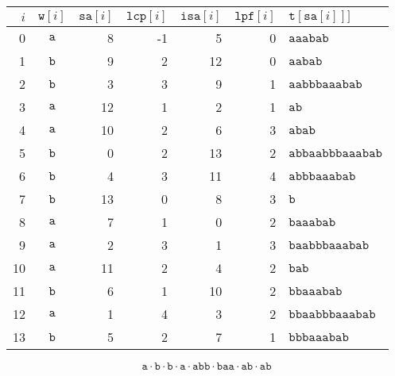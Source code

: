 \begin{center}
\begin{tabular}{rcrrrrl}\hline
$i$ & $\mathtt{w}[i]$ & $\mathtt{sa}[i]$ & $\mathtt{lcp}[i]$ & $\mathtt{isa}[i]$ & $\mathtt{lpf}[i]$ & $\mathtt{t}[\mathtt{sa}[i]]]$\\\hline
0 & $\mathtt{a}$ & 8 & -1 & 5 & 0 & $\mathtt{aaabab}$\\
1 & $\mathtt{b}$ & 9 & 2 & 12 & 0 & $\mathtt{aabab}$\\
2 & $\mathtt{b}$ & 3 & 3 & 9 & 1 & $\mathtt{aabbbaaabab}$\\
3 & $\mathtt{a}$ & 12 & 1 & 2 & 1 & $\mathtt{ab}$\\
4 & $\mathtt{a}$ & 10 & 2 & 6 & 3 & $\mathtt{abab}$\\
5 & $\mathtt{b}$ & 0 & 2 & 13 & 2 & $\mathtt{abbaabbbaaabab}$\\
6 & $\mathtt{b}$ & 4 & 3 & 11 & 4 & $\mathtt{abbbaaabab}$\\
7 & $\mathtt{b}$ & 13 & 0 & 8 & 3 & $\mathtt{b}$\\
8 & $\mathtt{a}$ & 7 & 1 & 0 & 2 & $\mathtt{baaabab}$\\
9 & $\mathtt{a}$ & 2 & 3 & 1 & 3 & $\mathtt{baabbbaaabab}$\\
10 & $\mathtt{a}$ & 11 & 2 & 4 & 2 & $\mathtt{bab}$\\
11 & $\mathtt{b}$ & 6 & 1 & 10 & 2 & $\mathtt{bbaaabab}$\\
12 & $\mathtt{a}$ & 1 & 4 & 3 & 2 & $\mathtt{bbaabbbaaabab}$\\
13 & $\mathtt{b}$ & 5 & 2 & 7 & 1 & $\mathtt{bbbaaabab}$\\
\hline\end{tabular}
\end{center}
\[
\mathtt{a}\cdot\mathtt{b}\cdot\mathtt{b}\cdot\mathtt{a}\cdot\mathtt{abb}\cdot\mathtt{baa}\cdot\mathtt{ab}\cdot\mathtt{ab}
\]
